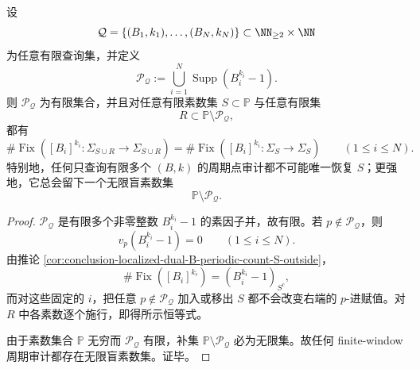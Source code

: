 \begin{theorem}[有限窗口周期审计的无限盲素数集]\label{thm:conclusion-localized-solenoid-finitewindow-periodic-audit-blind-primes}
设
\[
\mathcal Q=\{(B_1,k_1),\dots,(B_N,k_N)\}\subset \NN_{\ge 2}\times \NN
\]
为任意有限查询集，并定义
\[
\mathcal P_{\mathcal Q}
:=
\bigcup_{i=1}^{N}\operatorname{Supp}(B_i^{k_i}-1).
\]
则 \(\mathcal P_{\mathcal Q}\) 为有限集合，并且对任意有限素数集 \(S\subset \mathbb P\) 与任意有限集
\[
R\subset \mathbb P\setminus \mathcal P_{\mathcal Q},
\]
都有
\[
\#\operatorname{Fix}([B_i]^{k_i}\!:\Sigma_{S\cup R}\to \Sigma_{S\cup R})
=
\#\operatorname{Fix}([B_i]^{k_i}\!:\Sigma_S\to \Sigma_S)
\qquad (1\le i\le N).
\]
特别地，任何只查询有限多个 \((B,k)\) 的周期点审计都不可能唯一恢复 \(S\)；更强地，它总会留下一个无限盲素数集
\[
\mathbb P\setminus \mathcal P_{\mathcal Q}.
\]
\end{theorem}
\begin{proof}
\(\mathcal P_{\mathcal Q}\) 是有限多个非零整数 \(B_i^{k_i}-1\) 的素因子并，故有限。若 \(p\notin \mathcal P_{\mathcal Q}\)，则
\[
v_p(B_i^{k_i}-1)=0
\qquad (1\le i\le N).
\]
由推论 \ref{cor:conclusion-localized-dual-B-periodic-count-S-outside}，
\[
\#\operatorname{Fix}([B_i]^{k_i})
=
(B_i^{k_i}-1)_{S^c},
\]
而对这些固定的 \(i\)，把任意 \(p\notin \mathcal P_{\mathcal Q}\) 加入或移出 \(S\) 都不会改变右端的 \(p\)-进赋值。对 \(R\) 中各素数逐个施行，即得所示恒等式。

由于素数集合 \(\mathbb P\) 无穷而 \(\mathcal P_{\mathcal Q}\) 有限，补集 \(\mathbb P\setminus \mathcal P_{\mathcal Q}\) 必为无限集。故任何 finite-window 周期审计都存在无限盲素数集。证毕。
\end{proof}

